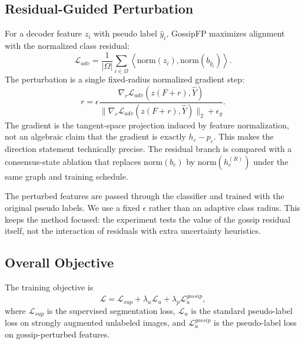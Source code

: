 \documentclass[10pt,twocolumn,letterpaper]{article}
\begin{document}
\subsection{Residual-Guided Perturbation}

For a decoder feature $z_i$ with pseudo label $\hat{y}_i$, GossipFP maximizes alignment with the normalized class residual:
\begin{equation}
    \mathcal{L}_{adv}
    =
    \frac{1}{|\Omega|}
    \sum_{i\in\Omega}
    \left\langle
    \mathrm{norm}(z_i),
    \mathrm{norm}(b_{\hat{y}_i})
    \right\rangle.
\end{equation}
The perturbation is a single fixed-radius normalized gradient step:
\begin{equation}
    r =
    \epsilon
    \frac{\nabla_r \mathcal{L}_{adv}(z(F+r),\hat{Y})}
    {\|\nabla_r \mathcal{L}_{adv}(z(F+r),\hat{Y})\|_2+\epsilon_g}.
\end{equation}
The gradient is the tangent-space projection induced by feature normalization, not an algebraic claim that the gradient is exactly $h_c-p_c$. This makes the direction statement technically precise. The residual branch is compared with a consensus-state ablation that replaces $\mathrm{norm}(b_c)$ by $\mathrm{norm}(h_c^{(R)})$ under the same graph and training schedule.

The perturbed features are passed through the classifier and trained with the original pseudo labels. We use a fixed $\epsilon$ rather than an adaptive class radius. This keeps the method focused: the experiment tests the value of the gossip residual itself, not the interaction of residuals with extra uncertainty heuristics.

\subsection{Overall Objective}

The training objective is
\begin{equation}
    \mathcal{L}
    =
    \mathcal{L}_{sup}
    +
    \lambda_u \mathcal{L}_{u}
    +
    \lambda_p \mathcal{L}_{u}^{gossip},
\end{equation}
where $\mathcal{L}_{sup}$ is the supervised segmentation loss, $\mathcal{L}_{u}$ is the standard pseudo-label loss on strongly augmented unlabeled images, and $\mathcal{L}_{u}^{gossip}$ is the pseudo-label loss on gossip-perturbed features.
\end{document}
